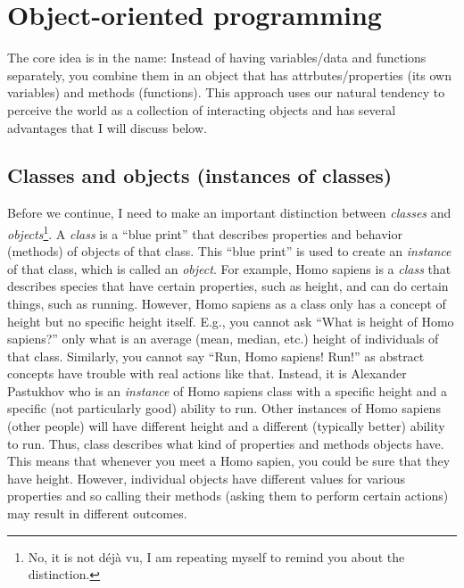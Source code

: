\documentclass[
]{book}
\begin{document}
\hypertarget{object-oriented-programming}{%
\section{Object-oriented programming}\label{object-oriented-programming}}

The core idea is in the name: Instead of having variables/data and functions separately, you combine them in an object that has attrbutes/properties (its own variables) and methods (functions). This approach uses our natural tendency to perceive the world as a collection of interacting objects and has several advantages that I will discuss below.

\hypertarget{classes-and-objects-instances-of-classes}{%
\subsection{Classes and objects (instances of classes)}\label{classes-and-objects-instances-of-classes}}

Before we continue, I need to make an important distinction between \emph{classes} and \emph{objects}\footnote{No, it is not déjà vu, I am repeating myself to remind you about the distinction.}. A \emph{class} is a ``blue print'' that describes properties and behavior (methods) of objects of that class. This ``blue print'' is used to create an \emph{instance} of that class, which is called an \emph{object}. For example, Homo sapiens is a \emph{class} that describes species that have certain properties, such as height, and can do certain things, such as running. However, Homo sapiens as a class only has a concept of height but no specific height itself. E.g., you cannot ask ``What is height of Homo sapiens?'' only what is an average (mean, median, etc.) height of individuals of that class. Similarly, you cannot say ``Run, Homo sapiens! Run!'' as abstract concepts have trouble with real actions like that. Instead, it is Alexander Pastukhov who is an \emph{instance} of Homo sapiens class with a specific height and a specific (not particularly good) ability to run. Other instances of Homo sapiens (other people) will have different height and a different (typically better) ability to run. Thus, class describes what kind of properties and methods objects have. This means that whenever you meet a Homo sapien, you could be sure that they have height. However, individual objects have different values for various properties and so calling their methods (asking them to perform certain actions) may result in different outcomes.
\end{document}
